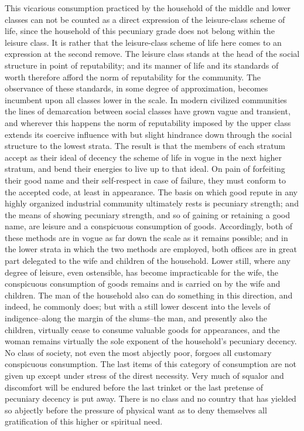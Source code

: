 \documentclass[12pt]{report}
\begin{document}
This vicarious consumption practiced by the household of the middle
and lower classes can not be counted as a direct expression of the
leisure-class scheme of life, since the household of this pecuniary
grade does not belong within the leisure class. It is rather that the
leisure-class scheme of life here comes to an expression at the second
remove. The leisure class stands at the head of the social structure in
point of reputability; and its manner of life and its standards of
worth therefore afford the norm of reputability for the community. The
observance of these standards, in some degree of approximation, becomes
incumbent upon all classes lower in the scale. In modern civilized
communities the lines of demarcation between social classes have grown
vague and transient, and wherever this happens the norm of reputability
imposed by the upper class extends its coercive influence with but
slight hindrance down through the social structure to the lowest strata.
The result is that the members of each stratum accept as their ideal of
decency the scheme of life in vogue in the next higher stratum, and bend
their energies to live up to that ideal. On pain of forfeiting their
good name and their self-respect in case of failure, they must conform
to the accepted code, at least in appearance. The basis on which good
repute in any highly organized industrial community ultimately rests is
pecuniary strength; and the means of showing pecuniary strength, and
so of gaining or retaining a good name, are leisure and a conspicuous
consumption of goods. Accordingly, both of these methods are in vogue
as far down the scale as it remains possible; and in the lower strata
in which the two methods are employed, both offices are in great part
delegated to the wife and children of the household. Lower still, where
any degree of leisure, even ostensible, has become impracticable for the
wife, the conspicuous consumption of goods remains and is carried on by
the wife and children. The man of the household also can do something
in this direction, and indeed, he commonly does; but with a still lower
descent into the levels of indigence--along the margin of the slums--the
man, and presently also the children, virtually cease to consume
valuable goods for appearances, and the woman remains virtually the sole
exponent of the household's pecuniary decency. No class of society,
not even the most abjectly poor, forgoes all customary conspicuous
consumption. The last items of this category of consumption are not
given up except under stress of the direst necessity. Very much of
squalor and discomfort will be endured before the last trinket or the
last pretense of pecuniary decency is put away. There is no class and
no country that has yielded so abjectly before the pressure of physical
want as to deny themselves all gratification of this higher or spiritual
need.
\end{document}
